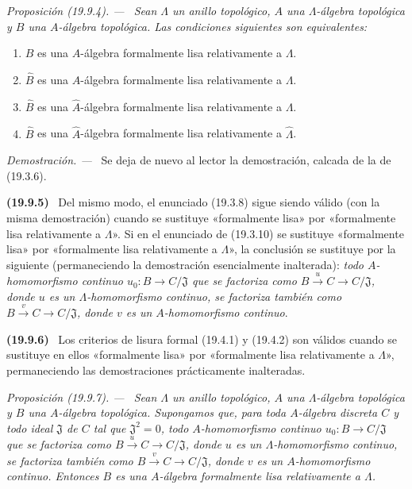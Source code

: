 \documentclass[10pt,oneside]{book}
\makeatletter
\newcommand{\setmanualcurrentlabel}[1]{\def\@currentlabel{#1}}
\newcommand{\oldpage}[2][]{%
  \setcounter{footnote}{0}%
  \marginpar{\scriptsize\textbf{#1}~|~#2}\ignorespaces}
\newenvironment{env}[1][]{\setmanualcurrentlabel{#1}\par\medskip\noindent\textbf{(#1)}\ }{\par}
\newenvironment{proposition}[1][]{%
  \setmanualcurrentlabel{#1}\par\medskip\noindent\itshape Proposición (#1). ---\ }{\par}
\newenvironment{proof}{%
  \par\medskip\noindent\textit{Demostración. ---\ }}{\par}
\makeatother
\begin{document}
\begin{proposition}[19.9.4]
\label{0.19.9.4-es}
Sean $\Lambda$ un anillo topológico, $A$ una $\Lambda$-álgebra topológica y
$B$ una $A$-álgebra topológica. Las condiciones siguientes son equivalentes:
\begin{enumerate}
  \item[\textup{a)}] $B$ es una $A$-álgebra formalmente lisa relativamente a $\Lambda$.
  \item[\textup{b)}] $\widehat B$ es una $A$-álgebra formalmente lisa relativamente a
  $\Lambda$.
  \item[\textup{c)}] $\widehat B$ es una $\widehat A$-álgebra formalmente lisa
  relativamente a $\Lambda$.
  \item[\textup{d)}] $\widehat B$ es una $\widehat A$-álgebra formalmente lisa
  relativamente a $\widehat\Lambda$.
\end{enumerate}
\end{proposition}

\begin{proof}
Se deja de nuevo al lector la demostración, calcada de la de (19.3.6).
\end{proof}

\oldpage[0\textsubscript{IV-1}]{115}

\begin{env}[19.9.5]
\label{0.19.9.5-es}
Del mismo modo, el enunciado (19.3.8) sigue siendo válido (con la misma
demostración) cuando se sustituye «formalmente lisa» por «formalmente lisa
relativamente a $\Lambda$». Si en el enunciado de (19.3.10) se sustituye
«formalmente lisa» por «formalmente lisa relativamente a $\Lambda$», la
conclusión se sustituye por la siguiente (permaneciendo la demostración
esencialmente inalterada): \emph{todo $A$-homomorfismo continuo
$u_0:B\to C/\mathfrak J$ que se factoriza como
$B\xrightarrow{u}C\to C/\mathfrak J$, donde $u$ es un $\Lambda$-homomorfismo
continuo, se factoriza también como $B\xrightarrow{v}C\to C/\mathfrak J$, donde
$v$ es un $A$-homomorfismo continuo}.
\end{env}

\begin{env}[19.9.6]
\label{0.19.9.6-es}
Los criterios de lisura formal (19.4.1) y (19.4.2) son válidos cuando se
sustituye en ellos «formalmente lisa» por «formalmente lisa relativamente a
$\Lambda$», permaneciendo las demostraciones prácticamente inalteradas.
\end{env}

\begin{proposition}[19.9.7]
\label{0.19.9.7-es}
Sean $\Lambda$ un anillo topológico, $A$ una $\Lambda$-álgebra topológica y
$B$ una $A$-álgebra topológica. Supongamos que, para toda $A$-álgebra discreta
$C$ y todo ideal $\mathfrak J$ de $C$ tal que $\mathfrak J^2=0$, todo
$A$-homomorfismo continuo $u_0:B\to C/\mathfrak J$ que se factoriza como
$B\xrightarrow{u}C\to C/\mathfrak J$, donde $u$ es un $\Lambda$-homomorfismo
continuo, se factoriza también como $B\xrightarrow{v}C\to C/\mathfrak J$, donde
$v$ es un $A$-homomorfismo continuo. Entonces $B$ es una $A$-álgebra
formalmente lisa relativamente a $\Lambda$.
\end{proposition}
\end{document}
